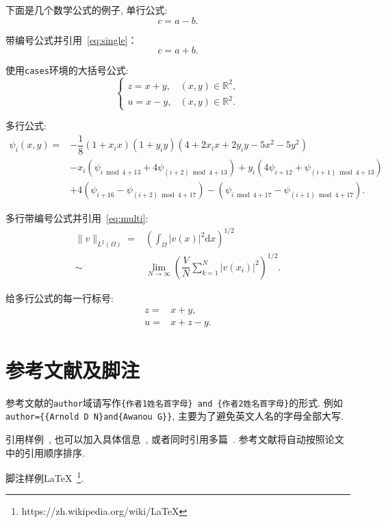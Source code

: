 下面是几个数学公式的例子, 单行公式:
\[c=a-b.\]

带编号公式并引用~\eqref{eq:single}：
\begin{equation}\label{eq:single}
c=a+b.
\end{equation}

使用{\tt cases}环境的大括号公式:
\begin{equation}\begin{cases}
z=x+y,&(x,y)\in\mathbb{R}^2,\\
u=x-y,&(x,y)\in\mathbb{R}^2.
\end{cases}
\end{equation}

多行公式:
\begin{align*}
\psi_i(x,y)=&-\dfrac18(1+x_ix)(1+y_iy)(4+2x_ix+2y_iy-5x^2-5y^2)\\
&-x_i(\psi_{i\bmod4+13}+4\psi_{(i+2)\bmod4+13})+y_i(4\psi_{i+12}+\psi_{(i+1)\bmod 4+13})\\
&+4(\psi_{i+16}-\psi_{(i+2)\bmod4+17})-(\psi_{i\bmod4+17}-\psi_{(i+1)\bmod4+17}).
\end{align*}

多行带编号公式并引用~\eqref{eq:multi}:
\begin{equation}\begin{aligned}\label{eq:multi}
\|v\|_{L^2(\Omega)}=&\left(\int_{\Omega}|v(x)|^2\mathrm{d}x\right)^{1/2}\\
\sim&\lim_{N\to\infty}\left(\dfrac{V}{N}\sum_{k=1}^N|v(x_i)|^2\right)^{1/2}.
\end{aligned}\end{equation}

给多行公式的每一行标号:
\begin{align}
z=&x+y,\\
u=&x+z-y.
\end{align}

\section{参考文献及脚注}
参考文献的{\tt author}域请写作{\tt \{作者1姓\quad 名首字母\} and \{作者2姓\quad 名首字母\}}的形式. 例如{\tt author=\{\{Arnold D N\}\quad and\quad \{Awanou G\}\}}, 主要为了避免英文人名的字母全部大写.

引用样例~\cite{Arnold:2011}, 也可以加入具体信息~\cite[Section 9.1]{Brezis:2011}, 或者同时引用多篇~\cite{Chen:2005,Arnold:2011,Brezis:2011}. 参考文献将自动按照论文中的引用顺序排序.

脚注样例\LaTeX~\footnote{https://zh.wikipedia.org/wiki/LaTeX}.